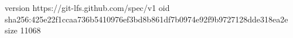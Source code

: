 version https://git-lfs.github.com/spec/v1
oid sha256:425e22f1ccaa736b5410976ef3bd8b861df7b0974e92f9b9727128dde318ea2e
size 11068
